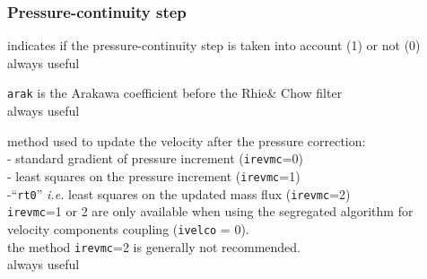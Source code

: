 \subsubsection{Pressure-continuity step}

{indicates if the pressure-continuity step is taken into account (1) or
not (0)\\
always useful}

{{\tt arak} is the Arakawa coefficient before the
Rhie\& Chow filter\\
always useful}

{method used to update the velocity after the pressure
correction:\\
\hspace*{0,5cm}- standard gradient of pressure increment
({\tt irevmc}=0)\\
\hspace*{0,5cm}- least squares on the pressure increment
({\tt irevmc}=1)\\
\hspace*{0,5cm}-``{\tt rt0}'' {\em i.e.} least squares on the updated mass flux
({\tt irevmc}=2)\\
{\tt irevmc}=1 or 2 are only available when using the segregated algorithm for velocity components coupling ({\tt ivelco} = 0).\\
the method {\tt irevmc}=2 is generally not recommended.\\
always useful}

